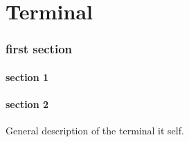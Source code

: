 
\part{Terminal}

\section{first section}

\subsection{section 1}

\subsection{section 2}


General description of the terminal it self.



